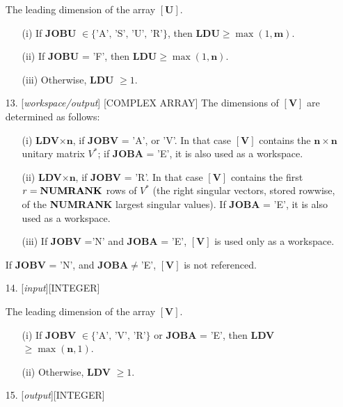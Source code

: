 \documentclass[12pt, a4paper, final]{article}
\numberwithin{equation}{section}
\begin{document}
\begin{itemize}
	The leading dimension of the array $\mathbf{[U]}$.
	\begin{itemize}  
		\item[(i)]  If \textbf{JOBU} $\in\{\mbox{'A', 'S', 'U', 'R'}\}$, then  \textbf{LDU}$\geq \max(1,\mathbf{m})$.  
		\item[(ii)]  If \textbf{JOBU} = 'F',  then \textbf{LDU}$\geq \max(1,\mathbf{n})$.
		\item[(iii)]  Otherwise, \textbf{LDU} $\geq 1$.
	\end{itemize}
	
	\item[13.]   [\emph{workspace/output}]  [{\sc COMPLEX ARRAY}] The dimensions of $\mathbf{[V]}$ are determined as follows:
	\begin{itemize}
		\item[(i)]  \textbf{LDV}$\times\mathbf{n}$, if \textbf{JOBV} = 'A', or 'V'. In that case  $\mathbf{[V]}$ contains the $\mathbf{n}\times\mathbf{n}$ unitary matrix $V^*$; if \textbf{JOBA} = 'E', it is also used as a workspace.
		\item[(ii)]  \textbf{LDV}$\times\mathbf{n}$, if \textbf{JOBV} = 'R'. In that case  $\mathbf{[V]}$ contains the first $r=\mbox{\textbf{NUMRANK}}$ rows of $V^*$ (the right singular vectors, stored rowwise, of the \textbf{NUMRANK} largest singular values).
		If \textbf{JOBA} = 'E', it is also used as a workspace.
		\item[(iii)]  If \textbf{JOBV} ='N' and \textbf{JOBA} = 'E', $\mathbf{[V]}$ is used only as a workspace.  
	\end{itemize}
	If \textbf{JOBV} = 'N', and \textbf{JOBA}$\neq$'E', $\mathbf{[V]}$ is not referenced. 
	\item[14.]  [\emph{input}][{\sc INTEGER}]
	
	The leading dimension of the array $\mathbf{[V]}$. 
	\begin{itemize} 
		\item[(i)] If \textbf{JOBV} $\in\{\mbox{'A', 'V', 'R'}\}$  or \textbf{JOBA} = 'E', then \textbf{LDV} $\geq\max(\mathbf{n},1)$.  
		\item[(ii)] Otherwise, \textbf{LDV} $\geq 1$.     
	\end{itemize} 
	\item[15.]  [\emph{output}][{\sc INTEGER}]
	

\end{itemize}
\end{document}
